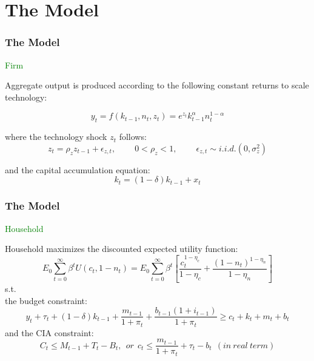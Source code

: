 \documentclass[handout]{beamer}
\begin{document}
\section{The Model}

\begin{frame}
\frametitle{The Model} \vskip 0.1in

\textcolor{green}{Firm}\vskip 0.1in

Aggregate output is produced according to the following constant
returns to scale technology:

\begin{equation}\label{Eq4.1}
y_{t}=f(k_{t-1},n_{t},z_{t})=e^{z_{t}}k_{t-1}^{\alpha}n_{t}^{1-\alpha}
\end{equation}

where the technology shock $z_{t}$ follows:
\begin{equation}\label{Eq4.2}
z_{t}=\rho_{z} z_{t-1} + \epsilon_{z,t}, ~ \qquad 0<\rho_{z}<1, ~
\qquad \epsilon_{z,t} \sim i.i.d.(0,\sigma_{z}^{2})
\end{equation}

and the capital accumulation equation:
\begin{equation}\label{Eq4.3}
k_{t}=(1-\delta)k_{t-1}+x_{t}
\end{equation}
\end{frame}


\begin{frame}
\frametitle{The Model} \vskip 0.1in

\textcolor{green}{Household}\vskip 0.1in

Household maximizes the discounted expected utility function:
\begin{equation}\label{Eq4.4}
E_{0}\sum_{t=0}^{\infty} \beta^{t} U(c_{t}, 1-n_{t}) =
E_{0}\sum_{t=0}^{\infty} \beta^{t}
[\frac{c_{t}^{1-\eta_{c}}}{1-\eta_{c}} +
\frac{(1-n_{t})^{1-\eta_{n}}}{1-\eta_{n}}]
\end{equation}
\pause
s.t.\\
the budget constraint:
\begin{equation}\label{Eq4.5}
y_{t}+\tau_{t}+(1-\delta)k_{t-1}+\frac{m_{t-1}}{1+\pi_{t}} +
\frac{b_{t-1}(1+i_{t-1})}{1+\pi_{t}} \geq c_{t}+k_{t}+m_{t} + b_{t}
\end{equation}
\pause and the CIA constraint:
\begin{equation}\label{Eq4.6}
C_{t} \leq M_{t-1}+ T_{t} - B_{t}, ~~or~~ c_{t}\leq
\frac{m_{t-1}}{1+\pi_{t}}+\tau_{t} - b_{t} ~~(in ~real ~term)
\end{equation}
\end{frame}
\end{document}
